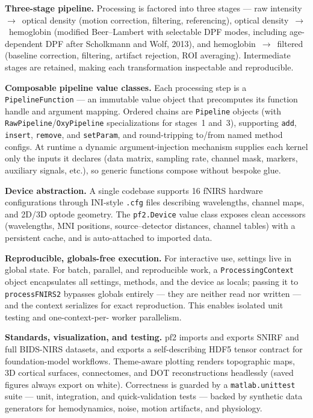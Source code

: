 \documentclass[11pt]{article}
\begin{document}
\textbf{Three-stage pipeline.} Processing is factored into three stages ---
raw intensity~$\rightarrow$~optical density (motion correction, filtering,
referencing), optical density~$\rightarrow$~hemoglobin (modified Beer--Lambert
with selectable DPF modes, including age-dependent DPF after Scholkmann and
Wolf, 2013), and hemoglobin~$\rightarrow$~filtered (baseline correction,
filtering, artifact rejection, ROI averaging). Intermediate stages are
retained, making each transformation inspectable and reproducible.

\textbf{Composable pipeline value classes.} Each processing step is a
\texttt{PipelineFunction} --- an immutable value object that precomputes its
function handle and argument mapping. Ordered chains are \texttt{Pipeline}
objects (with \texttt{RawPipeline}/\texttt{OxyPipeline} specializations for
stages~1 and~3), supporting \texttt{add}, \texttt{insert}, \texttt{remove}, and
\texttt{setParam}, and round-tripping to/from named method configs. At runtime a
dynamic argument-injection mechanism supplies each kernel only the inputs it
declares (data matrix, sampling rate, channel mask, markers, auxiliary signals,
etc.), so generic functions compose without bespoke glue.

\textbf{Device abstraction.} A single codebase supports 16 fNIRS hardware
configurations through INI-style \texttt{.cfg} files describing wavelengths,
channel maps, and 2D/3D optode geometry. The \texttt{pf2.Device} value class
exposes clean accessors (wavelengths, MNI positions, source--detector
distances, channel tables) with a persistent cache, and is auto-attached to
imported data.

\textbf{Reproducible, globals-free execution.} For interactive use, settings
live in global state. For batch, parallel, and reproducible work, a
\texttt{ProcessingContext} object encapsulates all settings, methods, and the
device as locals; passing it to \texttt{processFNIRS2} bypasses globals
entirely --- they are neither read nor written --- and the context serializes
for exact reproduction. This enables isolated unit testing and one-context-per-
worker parallelism.

\textbf{Standards, visualization, and testing.} pf2 imports and exports SNIRF
and full BIDS-NIRS datasets, and exports a self-describing HDF5 tensor contract
for foundation-model workflows. Theme-aware plotting renders topographic maps,
3D cortical surfaces, connectomes, and DOT reconstructions headlessly (saved
figures always export on white). Correctness is guarded by a
\texttt{matlab.unittest} suite --- unit, integration, and quick-validation
tests --- backed by synthetic data generators for hemodynamics, noise, motion
artifacts, and physiology.
\end{document}
